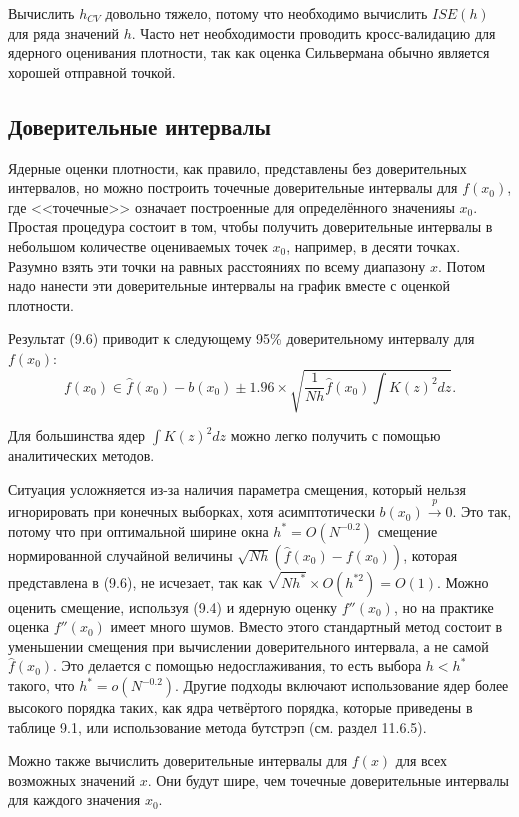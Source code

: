 Вычислить $h_{CV}$ довольно тяжело, потому что необходимо вычислить $ISE(h)$ для ряда значений $h$. Часто нет необходимости проводить кросс-валидацию для ядерного оценивания плотности, так как оценка Сильвермана обычно является хорошей отправной точкой.

\subsection{Доверительные интервалы}

Ядерные оценки плотности, как правило, представлены без доверительных интервалов, но можно построить точечные доверительные интервалы для $f(x_0)$, где <<точечные>> означает построенные для определённого значенияы $x_0$. Простая процедура состоит в том, чтобы получить доверительные интервалы в небольшом количестве оцениваемых точек $x_0$, например, в десяти точках. Разумно взять эти точки на равных расстояниях по всему диапазону $x$. Потом надо нанести эти доверительные интервалы на график вместе с оценкой  плотности.

Результат (9.6) приводит к следующему 95\% доверительному интервалу для $f(x_0)$:
\[
f(x_0) \in \hat{f}(x_0) - b(x_0) \pm 1.96 \times \sqrt{\frac{1}{Nh}\hat{f}(x_0)\int K(z)^2dz}.
\]

Для большинства ядер $\int K(z)^2dz$ можно легко получить с помощью аналитических методов.

Ситуация усложняется из-за наличия параметра смещения, который нельзя игнорировать при конечных выборках, хотя асимптотически $b(x_0) \stackrel{p}{\rightarrow} 0$. Это так, потому что при оптимальной ширине окна $h^* = O(N^{-0.2})$ смещение нормированной случайной величины $\sqrt{Nh}(\hat{f}(x_0) - f(x_0))$, которая представлена в (9.6), не исчезает, так как $\sqrt{Nh^*} \times O(h^{*2}) = O(1)$. Можно оценить смещение, используя (9.4) и ядерную оценку $f''(x_0)$, но на практике оценка $f''(x_0)$ имеет много шумов. Вместо этого стандартный метод
состоит в уменьшении смещения при вычислении доверительного интервала, а не самой $\hat{f}(x_0)$. Это делается с помощью недосглаживания, то есть выбора $h < h^*$ такого, что $h^* = o(N^{-0.2})$. Другие подходы включают использование ядер более высокого порядка таких, как ядра четвёртого порядка, которые приведены в таблице 9.1, или использование метода бутстрэп (см. раздел 11.6.5).

Можно также вычислить доверительные интервалы для $f(x)$ для всех возможных значений $x$. Они будут шире, чем точечные доверительные интервалы для каждого значения $x_0$.

